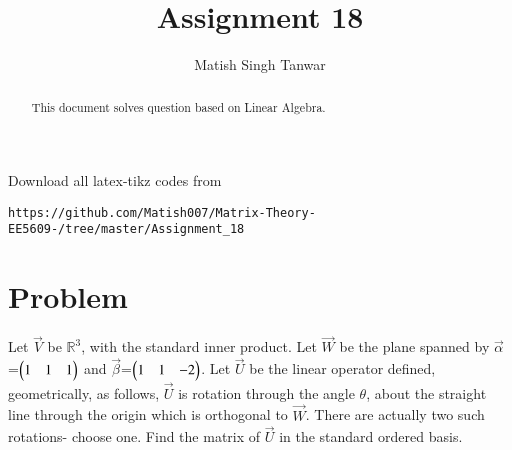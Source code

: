 \documentclass[journal,12pt,twocolumn]{IEEEtran}
\begin{document}
 \vspace{3cm}
 \title{Assignment 18}
 \author{Matish Singh Tanwar}
 \maketitle
 \newpage
 \bigskip
 \renewcommand{\thetable}{\theenumi}
\vspace{1.0cm}
\begin{abstract}
This document solves question based on Linear Algebra.
\end{abstract}
\vspace{0.5cm}
%
Download all latex-tikz codes from 
\begin{lstlisting}
https://github.com/Matish007/Matrix-Theory-EE5609-/tree/master/Assignment_18
\end{lstlisting}
%
%
\section{Problem}
 Let $\vec{V}$ be $\mathbb{R}^3$, with the standard inner product. Let $\vec{W}$ be the plane spanned by $\vec{\alpha}$=$\begin{pmatrix}1&1&1\end{pmatrix}$ and  $\vec{\beta}$=$\begin{pmatrix}1&1&-2\end{pmatrix}$. Let $\vec{U}$ be the linear operator defined, geometrically, as follows, $\vec{U}$ is rotation through the angle $\theta$, about the straight line through the origin which is orthogonal to $\vec{W}$. There are actually two such rotations- choose one. Find the matrix of $\vec{U}$ in the standard ordered basis.
\end{document}
